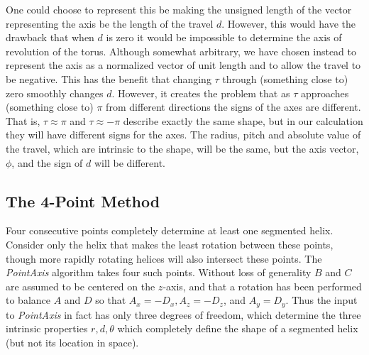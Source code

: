 \documentclass[mathematics,article,submit,pdftex,moreauthors]{Definitions/mdpi}
\begin{document}
One could choose to represent this be making the unsigned length of the vector
representing the axis be the length of the
travel $d$.
However, this would have the drawback that when $d$ is zero it would be impossible to determine
the axis of revolution of the torus.
Although somewhat arbitrary, we have chosen instead to represent the
axis as a normalized vector of unit length
and to allow the travel to be negative. This has the benefit that
changing $\tau$ through (something close to)
zero smoothly changes $d$. However, it creates the problem that as $\tau$ approaches
(something close to) $\pi$ from different directions the signs of the axes are different.
That is, $\tau \approx \pi$ and $\tau \approx -\pi$ describe exactly
the same shape, but in our calculation
they will have different signs for the axes. The radius, pitch and
absolute value of the travel,
which are intrinsic to the shape, will be the same,
but the axis vector, $\phi$, and the sign of $d$ will be different.

\subsection{The 4-Point Method}

Four consecutive points completely determine at least one segmented helix.
Consider
only the helix that makes the least rotation between these points,
though more rapidly rotating helices will also intersect these points.
The {\em PointAxis} algorithm
takes four such points. Without loss of generality $B$ and $C$
are assumed to be centered on the $z$-axis, and that a
rotation has been performed to balance $A$ and $D$ so that $A_x = -D_x, A_z = -D_z$, and $A_y = D_y$. Thus the input to
{\em PointAxis} in fact has only three degrees of freedom, which determine the three intrinsic properties $r,d,\theta$
which completely define the shape of a segmented helix (but not its location in space).
\end{document}
